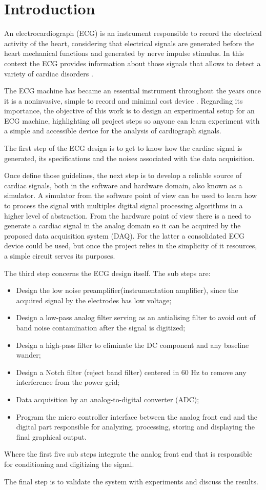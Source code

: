 \section{Introduction}

An electrocardiograph (ECG) is an instrument responsible to record the electrical activity of the heart, considering that electrical signals are generated before the heart mechanical functions and generated by nerve impulse stimulus. In this context the ECG provides information about those signals that allows to detect a variety of cardiac disorders \cite{khandpur1987handbook, murugappan2014development}.

The ECG machine has became an essential instrument throughout the years once it is a noninvasive, simple to record and minimal cost device \cite{barold2003willem}. Regarding its importance, the objective of this work is to design an experimental setup for an ECG machine, highlighting all project steps so anyone can learn experiment with a simple and accessible device for the analysis of cardiograph signals.

The first step of the ECG design is to get to know how the cardiac signal is generated, its specifications and the noises associated with the data acquisition.

Once define those guidelines, the next step is to develop a reliable source of cardiac signals, both in the software and hardware domain, also known as a simulator. A simulator from the software point of view can be used to learn how to process the signal with multiples digital signal processing algorithms in a higher level of abstraction. From the hardware point of view there is a need to generate a cardiac signal in the analog domain so it can be acquired by the proposed data acquisition system (DAQ). For the latter a consolidated ECG device could be used, but once the project relies in the simplicity of it resources, a simple circuit serves its purposes.

The third step concerns the ECG design itself. The sub steps are:

\begin{itemize}
    \item Design the low noise preamplifier(instrumentation amplifier), since the acquired signal by the electrodes has low voltage;
    \item Design a low-pass analog filter serving as an antialising filter to avoid out of band noise contamination after the signal is digitized;
    \item Design a high-pass filter to eliminate the DC component and any baseline wander;
    \item Design a Notch filter (reject band filter) centered in 60 Hz to remove any interference from the power grid;
    \item Data acquisition by an analog-to-digital converter (ADC);
    \item Program the micro controller interface between the analog front end and the digital part responsible for analyzing, processing, storing and displaying the final graphical output.
\end{itemize}

Where the first five sub steps integrate the analog front end that is responsible for conditioning and digitizing the signal.

The final step is to validate the system with experiments and discuss the results.

\pagebreak